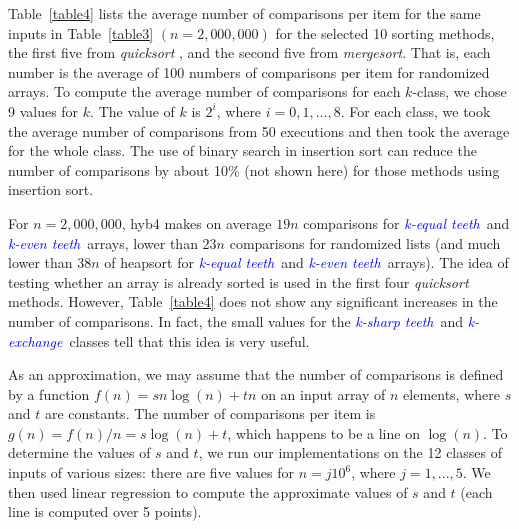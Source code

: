 \documentclass[AMA,STIX1COL]{WileyNJD-v2}
\newcommand{\keq}{\textcolor{blue}{\emph{k-equal teeth}}}
\newcommand{\kev}{\textcolor{blue}{\emph{k-even teeth}}}
\newcommand{\ksha}{\textcolor{blue}{\emph{k-sharp teeth}}}
\newcommand{\kexc}{\textcolor{blue}{\emph{k-exchange}}}
\newcommand{\qusort}{\emph{quicksort }}
\newcommand{\msortn}{\emph{mergesort}}
\begin{document}
Table~\ref{table4} lists the average number of comparisons per item for the same inputs in Table~\ref{table3} $(n = 2,000,000)$ for the selected 10 sorting methods, the first five from \qusort, and the second five from \msortn. 
That is, each number is the average of 100 numbers of comparisons per item for randomized arrays. 
To compute the average number of comparisons for each $k$-class, we chose 9 values for $k$. 
The value of $k$ is $2^i$, where $i = 0, 1, …, 8$. 
For each class, we took the average number of comparisons from 50 executions and then took the average for the whole class. 
The use of binary search in insertion sort can reduce the number of comparisons by about 10\% (not shown here) for those methods using insertion sort.

For $n = 2,000,000$, hyb4 makes on average $19n$ comparisons for \keq \ and \kev \ arrays, lower than $23n$ comparisons for randomized lists (and much lower than $38n$ of heapsort for \keq\ and \kev\ arrays). 
The idea of testing whether an array is already sorted is used in the first four \qusort methods. 
However, Table~\ref{table4} does not show any significant increases in the number of comparisons. 
In fact, the small values for the \ksha\ and \kexc\ classes tell that this idea is very useful.

As an approximation, we may assume that the number of comparisons is defined by a function $f(n) = sn\log(n) + tn$ on an input array of $n$ elements, where $s$ and $t$ are constants. 
The number of comparisons per item is $g(n) = f(n)/n = s\log(n) + t$, which happens to be a line on $\log(n)$. 
To determine the values of $s$ and $t$, we run our implementations on the 12 classes of inputs of various sizes: there are five values for $n = j10^6$, where $j = 1, ..., 5$. 
We then used linear regression to compute the approximate values of $s$ and $t$ (each line is computed over 5 points).
\end{document}

